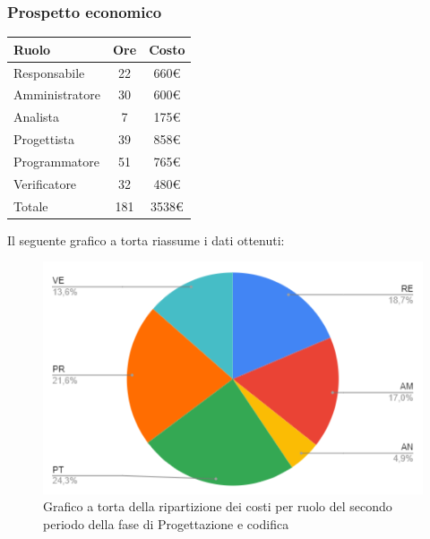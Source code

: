 {{{{{{{{{{{		\subsubsection{Prospetto economico}\label{PreventivoFaseDiProgettazioneDiDettaglioECodificaProspettoEconomicoPeriodo2}
		\quad
		\def\tabularxcolumn#1{m{#1}}
		{
			\begin{center}
				\renewcommand{\arraystretch}{1.4}
				\begin{tabularx}{7cm}{|X|c|c|}
					\hline
					\rowcolor{airforceblue}
					\textbf{Ruolo} & \textbf{Ore} & \textbf{Costo}\\
					\hline
					Responsabile & 22 & 660\euro\\
					\hline
					Amministratore & 30 & 600\euro\\
					\hline
					Analista & 7 & 175\euro\\
					\hline
					Progettista & 39 & 858\euro\\
					\hline
					Programmatore & 51 & 765\euro\\
					\hline
					Verificatore & 32 & 480\euro\\
					\hline
					Totale & 181 & 3538\euro\\
					\hline
				\end{tabularx}
			\end{center}
			
			Il seguente grafico a torta riassume i dati ottenuti:
			\begin{figure}[!ht]
				\begin{center}
					\includegraphics[width=0.8\linewidth]{../immagini/pdp/torta_progettazione_dettaglio_periodo2.png}
					\caption{Grafico a torta della ripartizione dei costi per ruolo del secondo periodo della fase di Progettazione e codifica}
				\end{center}
			\end{figure}

}}}}}}}}}}}}
